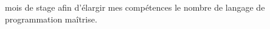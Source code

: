 \documentclass[a4paper, 11pt, french]{report}
\begin{document}
                                                                                                                                                                      mois
                                                                                                                                                                      de
                                                                                                                                                                      stage
                                                                                                                                                                      afin
                                                                                                                                                                      d'élargir
                                                                                                                                                                      mes
                                                                                                                                                                      compétences
                                                                                                                                                                      le
                                                                                                                                                                      nombre
                                                                                                                                                                      de
                                                                                                                                                                      langage
                                                                                                                                                                      de
                                                                                                                                                                      programmation
                                                                                                                                                                      maîtrise.
                                                                                                                                                                          \newline
\end{document}
